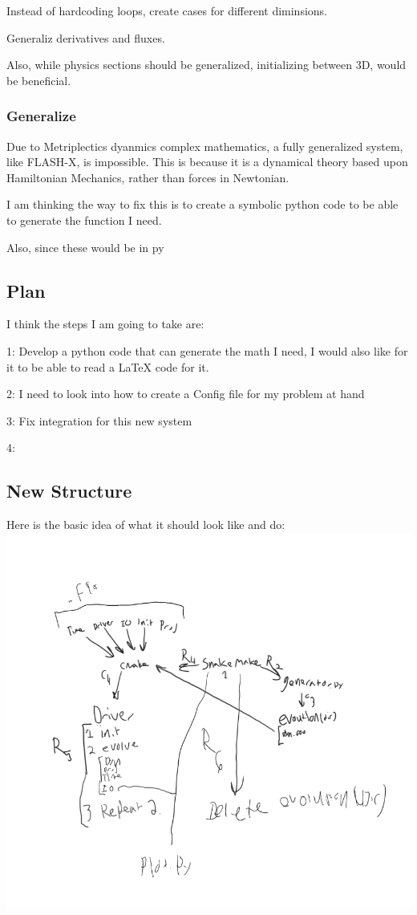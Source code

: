 Instead of hardcoding loops, create cases for different diminsions.


Generaliz derivatives and fluxes.

Also, while physics sections should be generalized, initializing between 3D, would be beneficial.
\subsubsection{Generalize}
Due to Metriplectics dyanmics complex mathematics, a fully generalized system, like FLASH-X, is impossible. This is because it is a dynamical theory based upon Hamiltonian Mechanics, rather than forces in Newtonian.

I am thinking the way to fix this is to create a symbolic python code to be able to generate the function I need.

Also, since these would be in py
\subsection{Plan}

I think the steps I am going to take are:

1: Develop a python code that can generate the math I need, I would also like for it to be able to read a LaTeX code for it.

2: I need to look into how to create a Config file for my problem at hand

3: Fix integration for this new system

4: 
\subsection{New Structure}
Here is the basic idea of what it should look like and do:
\includegraphics{../text/part_3/omega-x_overview.png}

